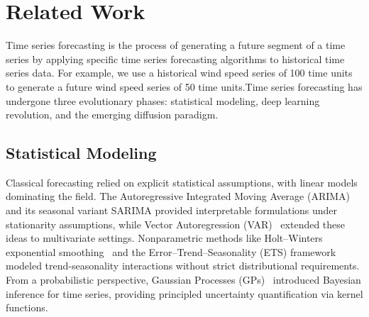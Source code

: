 \section{Related Work}\label{sec:related}
\renewcommand{\thesubsection}{\Alph{subsection}}   
\renewcommand{\thesection}{\arabic{section}}       
Time series forecasting is the process of generating a future segment of a time series by applying specific time series forecasting algorithms to historical time series data. For example, we use a historical wind speed series of 100 time units to generate a future wind speed series of 50 time units.Time series forecasting has undergone three evolutionary phases: statistical modeling, deep learning revolution, and the emerging diffusion paradigm.


\subsection{Statistical Modeling}
Classical forecasting relied on explicit statistical assumptions, with linear models dominating the field. 
The Autoregressive Integrated Moving Average (ARIMA)~\cite{DBLP:conf/nips/NaimanBPAFA24} and its seasonal variant SARIMA provided interpretable formulations under stationarity assumptions, while Vector Autoregression (VAR)~\cite{Zivot2003} extended these ideas to multivariate settings. 
Nonparametric methods like Holt–Winters exponential smoothing~\cite{KOEHLER2001269} and the Error–Trend–Seasonality (ETS) framework~\cite{RePEc2009} modeled trend-seasonality interactions without strict distributional requirements. 
From a probabilistic perspective, Gaussian Processes (GPs)~\cite{2005Gaussian} introduced Bayesian inference for time series, providing principled uncertainty quantification via kernel functions.


